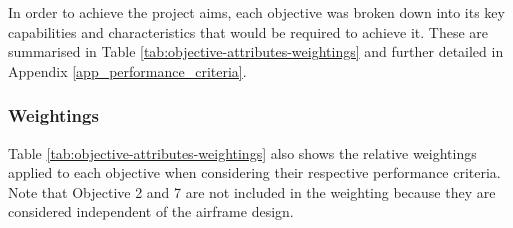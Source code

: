 In order to achieve the project aims, each objective was broken down into its key capabilities and characteristics that would be required to achieve it. These are summarised in Table \ref{tab:objective-attributes-weightings} and further detailed in Appendix \ref{app_performance_criteria}.















\subsubsection{Weightings}

Table \ref{tab:objective-attributes-weightings} also shows the relative weightings applied to each objective when considering their respective performance criteria. Note that Objective 2 and 7 are not included in the weighting because they are considered independent of the airframe design.

